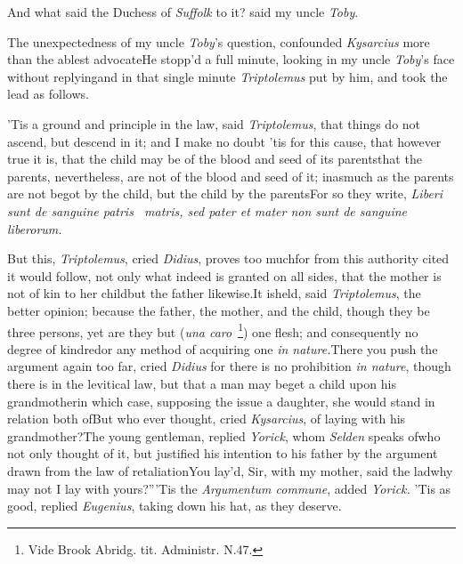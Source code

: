 \documentclass{article}
\begin{document}
And what said the Duchess of \textit{Suffolk} to it? said my uncle
\textit{Toby}.

The unexpectedness of my uncle\break
\textit{Toby}’s question, confounded \textit{Kysarcius}\break
more than the ablest advocate\tsh He\break
stopp’d a full minute, looking in my\break
uncle \textit{Toby}’s face without replying\tsh\pb and in
that single minute \textit{Triptolemus} put by him, and took the lead
as follows.

’Tis a ground and principle in the law, said \textit{Triptolemus}, that things do
not ascend, but descend in it; and I make no doubt ’tis for this cause, that however
true it is, that the child may be of the blood and seed of its parents\tsh that the
parents, nevertheless, are not of the blood and seed of it; inasmuch as the parents
are not begot by the child, but the child by the parents\tsk For so they write,
\textit{Liberi sunt de sanguine patris \et\ matris, sed
pater et mater non sunt de
sanguine liberorum.}

\tsh But this, \textit{Triptolemus}, cried \textit{Didius}, proves too much\tsk for from this
authority cited it would follow, not only\break
what indeed is granted on all sides,\pb 
that the mother is not of kin to her\break
child\tsk but the father likewise.\tsh It is\break held, said
\textit{Triptolemus}, the better opinion; because the
father, the mother,\break
and the child, though they be three\break
persons, yet are they but (\textit{una caro}\ \footnote{Vide Brook Abridg. tit. Administr. N.47.})\break
one flesh; and consequently no degree\break
of kindred\tsk or any method of acquiring one \textit{in
nature.}\tsk There you push the argument again too far,
cried \textit{Didius}\tsh\break
for there is no prohibition \textit{in nature},\break
though there is in the levitical law,\tsk\break
but that a man may beget a child upon\break
his grandmother\tsh in which case, supposing
the issue a daughter, she would stand in relation both
of\tsh But who\break
ever thought, cried \textit{Kysarcius}, of laying with his
grandmother?\tsk The young\break
gentleman, replied \textit{Yorick}, whom \textit{Selden}\break
speaks of\tsk who not only thought of it,\pb
but justified his intention to his father\break
by the argument drawn from the law\break
of retaliation\tsh \lqq You lay’d, Sir,\break
\lqq with my mother, said the lad\tsk why\break
\lqq may not I lay with yours?”\tsk ’Tis\break
the \textit{Argumentum commune}, added
\textit{Yorick.}\break
\tsk ’Tis as good, replied \textit{Eugenius}, taking down his hat, as they deserve.
\end{document}
